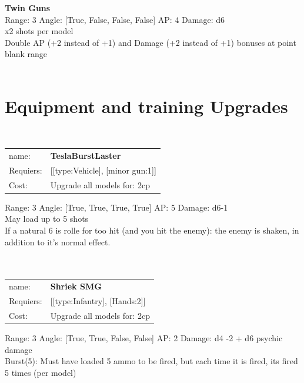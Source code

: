 {\bf Twin Guns } \\



Range: 3  Angle: [True, False, False, False] AP: 4 Damage: d6 \\
x2 shots per model\\ 
Double AP (+2 instead of +1) and Damage (+2 instead of +1) bonuses at point blank range\\ 




 
\ \\

\section{Equipment and training Upgrades}\ \\
\begin{tabular}{ll}
name: & {\bf TeslaBurstLaster } \\
Requiers: & [[type:Vehicle], [minor gun:1]] \\
Cost: & Upgrade all models for: 2cp \\
\end{tabular}



Range: 3  Angle: [True, True, True, True] AP: 5 Damage: d6-1 \\
May load up to 5 shots\\ 
If a natural 6 is rolle for too hit (and you hit the enemy): the enemy is shaken, in addition to it's normal effect.\\ 








\ \\
\ \\
\begin{tabular}{ll}
name: & {\bf Shriek SMG } \\
Requiers: & [[type:Infantry], [Hands:2]] \\
Cost: & Upgrade all models for: 2cp \\
\end{tabular}



Range: 3  Angle: [True, True, False, False] AP: 2 Damage: d4 -2 + d6 psychic damage \\
Burst(5): Must have loaded 5 ammo to be fired, but each time it is fired, its fired 5 times (per model)\\ 







